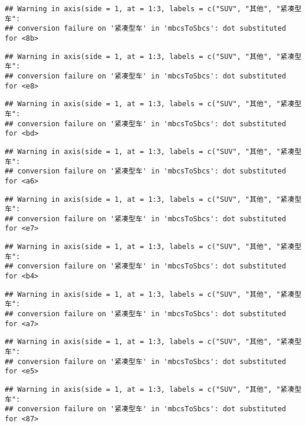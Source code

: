 \documentclass[]{article}
\begin{document}
\begin{verbatim}
## Warning in axis(side = 1, at = 1:3, labels = c("SUV", "其他", "紧凑型车":
## conversion failure on '紧凑型车' in 'mbcsToSbcs': dot substituted for <8b>
\end{verbatim}

\begin{verbatim}
## Warning in axis(side = 1, at = 1:3, labels = c("SUV", "其他", "紧凑型车":
## conversion failure on '紧凑型车' in 'mbcsToSbcs': dot substituted for <e8>
\end{verbatim}

\begin{verbatim}
## Warning in axis(side = 1, at = 1:3, labels = c("SUV", "其他", "紧凑型车":
## conversion failure on '紧凑型车' in 'mbcsToSbcs': dot substituted for <bd>
\end{verbatim}

\begin{verbatim}
## Warning in axis(side = 1, at = 1:3, labels = c("SUV", "其他", "紧凑型车":
## conversion failure on '紧凑型车' in 'mbcsToSbcs': dot substituted for <a6>
\end{verbatim}

\begin{verbatim}
## Warning in axis(side = 1, at = 1:3, labels = c("SUV", "其他", "紧凑型车":
## conversion failure on '紧凑型车' in 'mbcsToSbcs': dot substituted for <e7>
\end{verbatim}

\begin{verbatim}
## Warning in axis(side = 1, at = 1:3, labels = c("SUV", "其他", "紧凑型车":
## conversion failure on '紧凑型车' in 'mbcsToSbcs': dot substituted for <b4>
\end{verbatim}

\begin{verbatim}
## Warning in axis(side = 1, at = 1:3, labels = c("SUV", "其他", "紧凑型车":
## conversion failure on '紧凑型车' in 'mbcsToSbcs': dot substituted for <a7>
\end{verbatim}

\begin{verbatim}
## Warning in axis(side = 1, at = 1:3, labels = c("SUV", "其他", "紧凑型车":
## conversion failure on '紧凑型车' in 'mbcsToSbcs': dot substituted for <e5>
\end{verbatim}

\begin{verbatim}
## Warning in axis(side = 1, at = 1:3, labels = c("SUV", "其他", "紧凑型车":
## conversion failure on '紧凑型车' in 'mbcsToSbcs': dot substituted for <87>
\end{verbatim}
\end{document}
